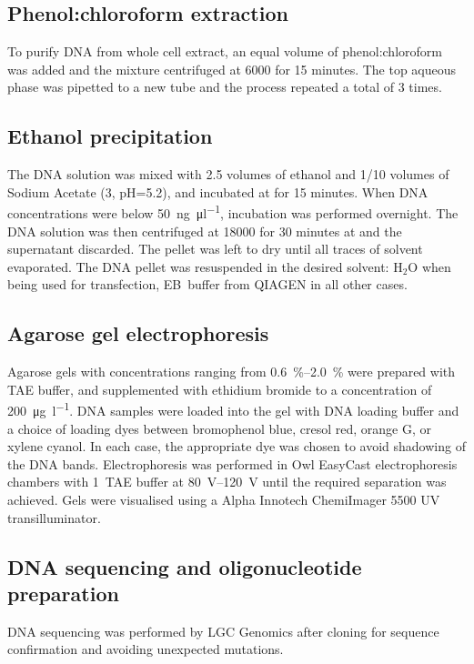     \subsection{Phenol:chloroform extraction}
      \label{sec:phenol-extraction}
      To purify DNA from whole cell extract,
      an equal volume of phenol:chloroform was
      added and the mixture centrifuged at \SI{6000}{\gn} for 15 minutes.
      The top aqueous phase was pipetted to a new tube and
      the process repeated a total of 3 times.

    \subsection{Ethanol precipitation}
      \label{sec:ethanol-precipitation}
      The DNA solution was mixed with \num{2.5} volumes of  ethanol
      and \num{1/10} volumes of Sodium Acetate (\SI{3}{\Molar}, pH=\num{5.2}),
      and incubated at  for 15 minutes. When DNA concentrations were below
      \SI{50}{\ng\per\ul}, incubation was performed overnight.
      The DNA solution was then centrifuged at
      \SI{18000}{\gn} for 30 minutes at  and the supernatant discarded.
      The pellet was left to dry until all traces of solvent evaporated.
      The DNA pellet
      was resuspended in the desired solvent:
      H$_2$O when being used for transfection,
      EB~buffer from QIAGEN in all other cases.

    \subsection{Agarose gel electrophoresis}
      Agarose gels with concentrations ranging from \SIrange{0.6}{2.0}{\percent}
      were prepared with TAE buffer, and supplemented with ethidium
      bromide to a concentration of \SI{200}{\ug\per\l}.
      DNA samples were loaded into the gel with DNA loading buffer and a
      choice of loading dyes between bromophenol blue, cresol red, orange G, or
      xylene cyanol.  In each case, the appropriate dye was chosen
      to avoid shadowing of the DNA bands. Electrophoresis was
      performed in Owl EasyCast electrophoresis chambers with
      \SI{1}{\X}~TAE buffer at
      \SIrange{80}{120}{\volt} until the required separation was achieved.
      Gels were visualised using a
      Alpha Innotech ChemiImager 5500 UV transilluminator.

    \subsection{DNA sequencing and oligonucleotide preparation}
      DNA sequencing was performed by LGC Genomics after cloning for sequence
      confirmation and avoiding unexpected mutations.


